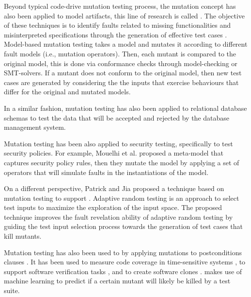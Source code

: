 
Beyond typical code-drive mutation testing process, the mutation concept has also been applied to model artifacts, this line of research is called . The objective of these techniques is to identify faults related to missing functionalities and misinterpreted specifications through the generation of effective test cases \cite{devroey2016featured,belli2016model}.
Model-based mutation testing takes a model and mutates it according to different fault models (i.e., mutation operators). Then, each mutant is compared to the original model, this is done via conformance checks through model-checking or SMT-solvers. If a mutant does not conform to the original model, then new test cases are generated by considering the the inputs that exercise behaviours that differ for the original and mutated models\cite{8411732}.

In a similar fashion, mutation testing has also been applied to relational database schemas \cite{wright2013efficient} to test the data that will be accepted and rejected by the database management system.


Mutation testing has been also applied to security testing, specifically to test security policies. For example, Mouelhi et al. \cite{mouelhiv2008generic} proposed a meta-model that captures security policy rules, then they mutate the model by applying a set of operators that will simulate faults in the instantiations of the model. 

On a different perspective, Patrick and Jia \cite{patrick2015kernel} proposed a technique based on mutation testing to support .
Adaptive random testing is an approach to select test inputs to maximize the exploration of the input space.
The proposed technique improves the fault revelation ability of adaptive random testing by guiding the test input selection process towards the generation of test cases that kill mutants.

Mutation testing has also been used to  by applying mutations to postconditions clauses \cite{galeotti2015inferring}. It has been used to measure code coverage in time-sensitive systems \cite{pankumhang2015iterative}, to support software verification tasks \cite{groce2015verified}, and to create software clones \cite{roy2009mutation}.  \cite{zhang2018predictive} makes use of machine learning to predict if a certain mutant will likely be killed by a test suite.




